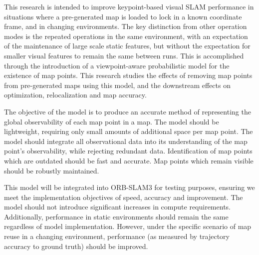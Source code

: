 
This research is intended to improve keypoint-based visual SLAM performance in situations where a pre-generated map is loaded to lock in a known coordinate frame, and in changing environments. The key distinction from other operation modes is the repeated operations in the same environment, with an expectation of the maintenance of large scale static features, but without the expectation for smaller visual features to remain the same between runs. This is accomplished through the introduction of a viewpoint-aware probabilistic model for the existence of map points. This research studies the effects of removing map points from pre-generated maps using this model, and the downstream effects on optimization, relocalization and map accuracy.


The objective of the model is to produce an accurate method of representing the global observability of each map point in a map. The model should be lightweight, requiring only small amounts of additional space per map point. The model should integrate all observational data into its understanding of the map point's observability, while rejecting redundant data. Identification of map points which are outdated should be fast and accurate. Map points which remain visible should be robustly maintained.


This model will be integrated into ORB-SLAM3 for testing purposes, ensuring we meet the implementation objectives of speed, accuracy and improvement. The model should not introduce significant increases in compute requirements. Additionally, performance in static environments should remain the same regardless of model implementation. However, under the specific scenario of map reuse in a changing environment, performance (as measured by trajectory accuracy to ground truth) should be improved.